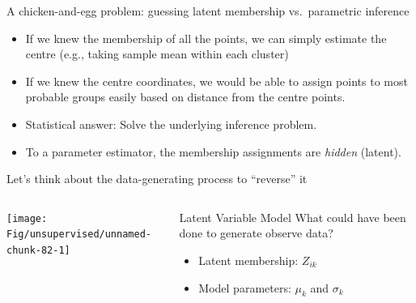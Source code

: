 \documentclass[
  ignorenonframetext,
  aspectratio=169]{beamer}
\begin{document}
\begin{frame}{A chicken-and-egg problem: guessing latent membership
vs.~parametric inference}
\protect\hypertarget{a-chicken-and-egg-problem-guessing-latent-membership-vs.-parametric-inference}{}
\begin{itemize}
\item
  If we knew the membership of all the points, we can simply estimate
  the centre (e.g., taking sample mean within each cluster)
\item
  If we knew the centre coordinates, we would be able to assign points
  to most probable groups easily based on distance from the centre
  points.
\item
  Statistical answer: Solve the underlying inference problem.
\item
  To a parameter estimator, the membership assignments are \emph{hidden}
  (latent).
\end{itemize}

\scriptsize

\normalsize

\scriptsize

\normalsize
\end{frame}

\begin{frame}{Let's think about the data-generating process to
``reverse'' it}
\protect\hypertarget{lets-think-about-the-data-generating-process-to-reverse-it}{}
\begin{columns}[T]
\begin{column}{.5\textwidth}
\scriptsize

\begin{center}\texttt{[image: Fig/unsupervised/unnamed-chunk-82-1]} \end{center}

\normalsize
\end{column}

\begin{column}{.45\textwidth}
\begin{block}{Latent Variable Model}
\protect\hypertarget{latent-variable-model}{}
What could have been done to generate observe data?

\begin{itemize}
\item
  Latent membership: \(Z_{ik}\)
\item
  Model parameters: \(\mu_{k}\) and \(\sigma_{k}\)
\end{itemize}
\end{block}
\end{column}
\end{columns}
\end{frame}
\end{document}
